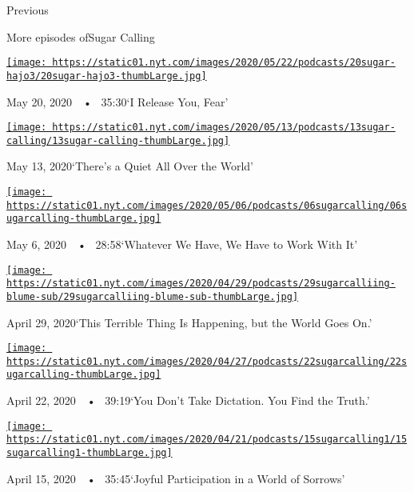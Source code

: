 Previous

More episodes ofSugar Calling

\href{https://www.nytimes.com/2020/05/20/podcasts/sugar-calling-joy-harjo-poetry-virus.html?action=click\&module=audio-series-bar\&region=header\&pgtype=Article}{\texttt{[image: https://static01.nyt.com/images/2020/05/22/podcasts/20sugar-hajo3/20sugar-hajo3-thumbLarge.jpg]}}

May 20, 2020~~•~ 35:30`I Release You, Fear'

\href{https://www.nytimes.com/2020/05/13/podcasts/sugar-calling-billy-collins-poetry-virus.html?action=click\&module=audio-series-bar\&region=header\&pgtype=Article}{\texttt{[image: https://static01.nyt.com/images/2020/05/13/podcasts/13sugar-calling/13sugar-calling-thumbLarge.jpg]}}

May 13, 2020`There's a Quiet All Over the World'

\href{https://www.nytimes.com/2020/05/06/podcasts/sugar-calling-alice-walker-quarantine-virus.html?action=click\&module=audio-series-bar\&region=header\&pgtype=Article}{\texttt{[image: https://static01.nyt.com/images/2020/05/06/podcasts/06sugarcalling/06sugarcalling-thumbLarge.jpg]}}

May 6, 2020~~•~ 28:58`Whatever We Have, We Have to Work With It'

\href{https://www.nytimes.com/2020/04/29/podcasts/sugar-calling-judy-blume-quarantine-virus.html?action=click\&module=audio-series-bar\&region=header\&pgtype=Article}{\texttt{[image: https://static01.nyt.com/images/2020/04/29/podcasts/29sugarcalliing-blume-sub/29sugarcalliing-blume-sub-thumbLarge.jpg]}}

April 29, 2020`This Terrible Thing Is Happening, but the World Goes On.'

\href{https://www.nytimes.com/2020/04/22/podcasts/sugar-calling-amy-tan-quarantine-virus.html?action=click\&module=audio-series-bar\&region=header\&pgtype=Article}{\texttt{[image: https://static01.nyt.com/images/2020/04/27/podcasts/22sugarcalling/22sugarcalling-thumbLarge.jpg]}}

April 22, 2020~~•~ 39:19`You Don't Take Dictation. You Find the Truth.'

\href{https://www.nytimes.com/2020/04/15/podcasts/sugar-calling-pico-iyer-coronavirus.html?action=click\&module=audio-series-bar\&region=header\&pgtype=Article}{\texttt{[image: https://static01.nyt.com/images/2020/04/21/podcasts/15sugarcalling1/15sugarcalling1-thumbLarge.jpg]}}

April 15, 2020~~•~ 35:45`Joyful Participation in a World of Sorrows'

